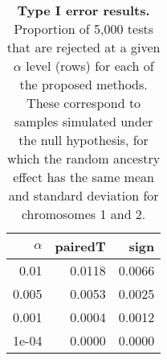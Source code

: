 \documentclass[11pt, letterpaper]{article}
\begin{document}
\def \v{\mbox{var}}
\def \E{\mbox{E}}
\def \c{\mbox{cov}}


\newcommand{\bmX}{\mbox{\boldmath $X$}}
\newcommand{\bmY}{\mbox{\boldmath $Y$}}
\newcommand{\bmy}{\mbox{\boldmath $y$}}
\newcommand{\bmZ}{\mbox{\boldmath $Z$}}
\newcommand{\bmz}{\mbox{\boldmath $z$}}
\newcommand{\bmx}{\mbox{\boldmath $x$}}
\newcommand{\bmQ}{\mbox{\boldmath $Q$}}
\newcommand{\bmU}{\mbox{\boldmath $U$}}
\newcommand{\bmu}{\mbox{\boldmath $u$}}
\newcommand{\bmV}{\mbox{\boldmath $V$}}
\newcommand{\bmI}{\mbox{\boldmath $I$}}
\newcommand{\bmW}{\mbox{\boldmath $W$}}
\newcommand{\bmD}{\mbox{\boldmath $D$}}
\newcommand{\bms}{\mbox{\boldmath $s$}}
\newcommand{\bma}{\mbox{\boldmath $a$}}
\newcommand{\bmb}{\mbox{\boldmath $b$}}
\newcommand{\bmq}{\mbox{\boldmath $q$}}
\newcommand{\bmf}{\mbox{\boldmath $f$}}
\newcommand{\bmA}{\mbox{\boldmath $A$}}
\newcommand{\Prob}{\mbox{Pr}}
\newcommand{\bmone}{\mbox{\bf 1}}
\newcommand{\bmzero}{\mbox{\bf 0}}
\newcommand{\bmbeta}{\mbox{\boldmath $\beta$}}
\newcommand{\bmdelta}{\mbox{\boldmath $\delta$}}
\newcommand{\bmtheta}{\mbox{\boldmath $\theta$}}
\newcommand{\bmpsi}{\mbox{\boldmath $\psi$}}
\newcommand{\bmphi}{\mbox{\boldmath $\phi$}}
\newcommand{\bmnu}{\mbox{\boldmath $\nu$}}
\newcommand{\bmgamma}{\mbox{\boldmath $\gamma$}}
\newcommand{\bmmu}{\mbox{\boldmath $\mu$}}
\newcommand{\bmepsilon}{\mbox{\boldmath $\epsilon$}}
\newcommand{\bmSigma}{\mbox{\boldmath $\Sigma$}}
\newcommand{\bmsigma}{\mbox{\boldmath $\sigma$}}

\newcommand{\mR}{\ensuremath{\pmb{\mathsf{R}}}}
\newcommand{\mX}{\ensuremath{\pmb{\mathsf{X}}}}
\newcommand{\mx}{\ensuremath{\pmb{\mathsf{x}}}}
\newcommand{\mV}{\ensuremath{\pmb{\mathsf{V}}}}
\newcommand{\mW}{\ensuremath{\pmb{\mathsf{W}}}}


\newcommand\independent{\protect\mathpalette{\protect\independenT}{\perp}}
\def\independenT#1#2{\mathrel{\rlap{$#1#2$}\mkern2mu{#1#2}}}

\begin{table}[ht]
\centering
\begin{tabular}{rrr}
  \hline
$\alpha$ & pairedT & sign \\ 
  \hline
0.01 & 0.0118 & 0.0066 \\ 
0.005 & 0.0053 & 0.0025\\
  0.001 & 0.0004 & 0.0012 \\ 
  1e-04 & 0.0000 & 0.0000 \\ 
  \hline
\end{tabular}
\caption{\textbf{Type I error results.} Proportion of 5,000 tests that are rejected at a given $\alpha$ level (rows) for each of the proposed methods. These correspond to samples simulated under the null hypothesis, for which the random ancestry effect has the same mean and standard deviation for chromosomes 1 and 2.}
\end{table}
\vspace{3cm}
\end{document}
